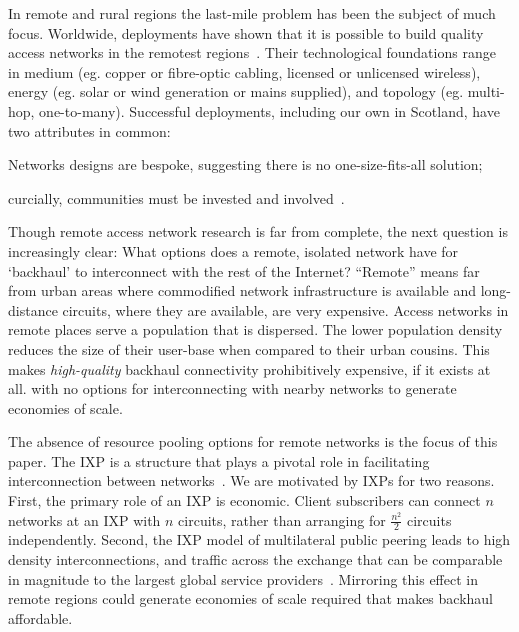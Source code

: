 In remote and rural regions the last-mile problem has been the subject of much
focus. Worldwide, deployments have shown that it is possible to build quality
access networks in the remotest regions~\cite{xxx}. Their technological
foundations range in medium (eg. copper or fibre-optic cabling, licensed
or unlicensed wireless), energy (eg. solar or wind generation or
mains supplied), and topology (eg. multi-hop,
one-to-many). Successful deployments, including our own in Scotland,
have two attributes in common:
\begin{inparaenum}[(i)]
  \item Networks designs are bespoke, suggesting
    there is no one-size-fits-all solution;
  \item curcially, communities must be invested and
  involved~\cite{Wallace:2015a,
    Wallace2015b}.
\end{inparaenum}

Though remote access network research is far from complete, the next question
is increasingly clear: What options does a remote, isolated network have for
`backhaul' to interconnect with the rest of the Internet? ``Remote'' means far
from urban areas where commodified network infrastructure is available and
long-distance circuits, where they are available, are very expensive. Access
networks in remote places serve a population that is dispersed. The lower
population density reduces the size of their user-base when compared to their
urban cousins. This makes \emph{high-quality} backhaul connectivity
prohibitively expensive, if it exists at all. with no options for
interconnecting with nearby networks to generate economies of scale.


The absence of resource pooling options for remote networks is the focus of this
paper. The \acf{IXP} is a structure
that plays a pivotal role in facilitating interconnection between
networks~\cite{Ager::2012}. We are motivated by \acp{IXP} for two reasons.
First, the primary role of an \ac{IXP} is economic. Client subscribers can
connect $n$ networks at an IXP with $n$ circuits, rather than arranging for
$\frac{n^2}{2}$ circuits independently. Second, the \ac{IXP} model of
multilateral public peering leads to high density interconnections, and traffic
across the exchange that can be comparable in magnitude to the largest global
service providers~\cite{Ager:2012:ALE:2342356.2342393}. Mirroring this effect in
remote regions could generate economies of scale required that makes backhaul
affordable.

